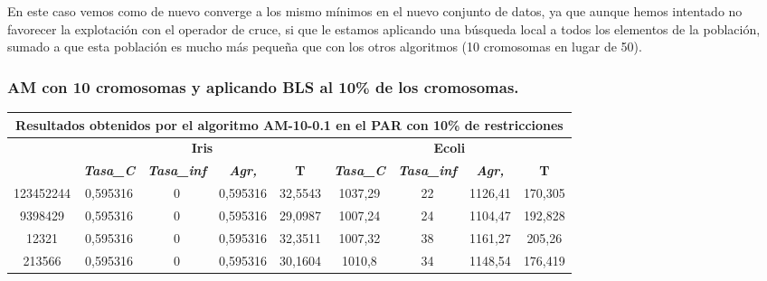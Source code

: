 \documentclass[12pt, spanish]{article}
\begin{document}
En este caso vemos como de nuevo converge a los mismo mínimos en el nuevo conjunto de datos, ya que aunque hemos intentado no favorecer la explotación con el operador de cruce, si que le estamos aplicando una búsqueda local a todos los elementos de la población, sumado a que esta población es mucho más pequeña que con los otros algoritmos (10 cromosomas en lugar de 50).

\subsubsection{AM con 10 cromosomas y aplicando BLS al 10\% de los cromosomas.}

\begin{table}[H]
\footnotesize
\begin{tabular}{|c|c|c|c|c|c|c|c|c|}
\hline
\multicolumn{9}{|c|}{\textbf{Resultados obtenidos por el algoritmo AM-10-0.1 en el PAR con 10\% de restricciones}}                                                                                                \\ \hline
\multirow{2}{*}{} & \multicolumn{4}{c|}{\textbf{Iris}}                                                            & \multicolumn{4}{c|}{\textbf{Ecoli}}                                                           \\ \cline{2-9} 
                  & \textit{\textbf{Tasa\_C}} & \textit{\textbf{Tasa\_inf}} & \textit{\textbf{Agr,}} & \textbf{T} & \textit{\textbf{Tasa\_C}} & \textit{\textbf{Tasa\_inf}} & \textit{\textbf{Agr,}} & \textbf{T} \\ \hline
123452244         & 0,595316                  & 0                           & 0,595316               & 32,5543    & 1037,29                   & 22                          & 1126,41                & 170,305    \\ \hline
9398429           & 0,595316                  & 0                           & 0,595316               & 29,0987    & 1007,24                   & 24                          & 1104,47                & 192,828    \\ \hline
12321             & 0,595316                  & 0                           & 0,595316               & 32,3511    & 1007,32                   & 38                          & 1161,27                & 205,26     \\ \hline
213566            & 0,595316                  & 0                           & 0,595316               & 30,1604    & 1010,8                    & 34                          & 1148,54                & 176,419    \\ \hline

\end{tabular}
\end{table}
\end{document}
